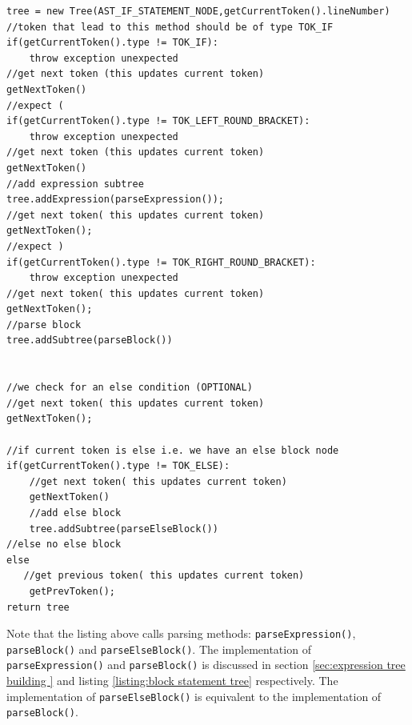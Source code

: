 \begin{lstlisting}[caption=PSEUDOCODE for building an if statement tree (\emph{ifStatement()})]
tree = new Tree(AST_IF_STATEMENT_NODE,getCurrentToken().lineNumber)
//token that lead to this method should be of type TOK_IF
if(getCurrentToken().type != TOK_IF):
    throw exception unexpected 
//get next token (this updates current token)
getNextToken()
//expect (
if(getCurrentToken().type != TOK_LEFT_ROUND_BRACKET):
    throw exception unexpected 
//get next token (this updates current token)
getNextToken()
//add expression subtree
tree.addExpression(parseExpression());
//get next token( this updates current token)
getNextToken();
//expect )
if(getCurrentToken().type != TOK_RIGHT_ROUND_BRACKET):
    throw exception unexpected 
//get next token( this updates current token)
getNextToken();
//parse block 
tree.addSubtree(parseBlock())


//we check for an else condition (OPTIONAL)
//get next token( this updates current token)
getNextToken();

//if current token is else i.e. we have an else block node
if(getCurrentToken().type != TOK_ELSE):
    //get next token( this updates current token)
    getNextToken()
    //add else block
    tree.addSubtree(parseElseBlock())
//else no else block 
else 
   //get previous token( this updates current token)
    getPrevToken(); 
return tree
\end{lstlisting}
Note that the listing above calls parsing methods: \verb!parseExpression()!, \verb!parseBlock()! and \verb!parseElseBlock()!. The implementation of \verb!parseExpression()! and \verb!parseBlock()! is discussed in  section \ref{sec:expression tree building } and listing \ref{listing:block statement tree} respectively.
The implementation of \verb!parseElseBlock()! is equivalent to the implementation of \verb!parseBlock()!.



